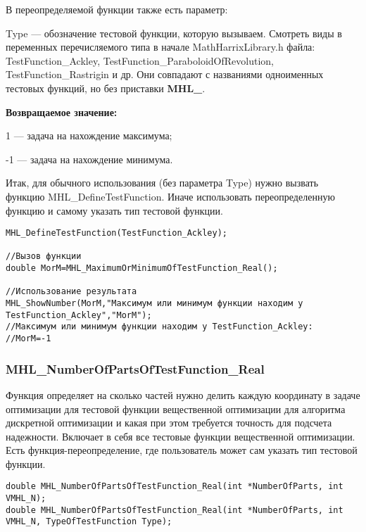 \documentclass[a4paper,12pt]{article}
\begin{document}
В переопределяемой функции также есть параметр:
  
Type --- обозначение тестовой функции, которую вызываем.
Смотреть виды в переменных перечисляемого типа в начале MathHarrixLibrary.h файла: TestFunction\_Ackley, TestFunction\_ParaboloidOfRevolution, TestFunction\_Rastrigin и др. Они совпадают с названиями одноименных тестовых функций, но без приставки \textbf{MHL\_}.

\textbf{Возвращаемое значение:}
 
1 --- задача на нахождение максимума;

-1 --- задача на нахождение минимума.

Итак, для обычного использования (без параметра Type) нужно вызвать функцию MHL\_DefineTestFunction. Иначе использовать переопределенную функцию и самому указать тип тестовой функции.


\begin{lstlisting}[label=code_use_MHL_MaximumOrMinimumOfTestFunction_Real,caption=Пример использования]
MHL_DefineTestFunction(TestFunction_Ackley);

//Вызов функции
double MorM=MHL_MaximumOrMinimumOfTestFunction_Real();

//Использование результата
MHL_ShowNumber(MorM,"Максимум или минимум функции находим у TestFunction_Ackley","MorM");
//Максимум или минимум функции находим у TestFunction_Ackley:
//MorM=-1
\end{lstlisting}

\subsubsection{MHL\_NumberOfPartsOfTestFunction\_Real}\label{MHL_NumberOfPartsOfTestFunction_Real}

Функция определяет на сколько частей нужно делить каждую координату в задаче оптимизации для тестовой функции вещественной оптимизации для алгоритма дискретной оптимизации и какая при этом требуется точность для подсчета надежности. Включает в себя все тестовые функции вещественной оптимизации. Есть функция-переопределение, где пользователь может сам указать тип тестовой функции.


\begin{lstlisting}[label=code_syntax_MHL_NumberOfPartsOfTestFunction_Real,caption=Синтаксис]
double MHL_NumberOfPartsOfTestFunction_Real(int *NumberOfParts, int VMHL_N);
double MHL_NumberOfPartsOfTestFunction_Real(int *NumberOfParts, int VMHL_N, TypeOfTestFunction Type);
\end{lstlisting}
\end{document}
